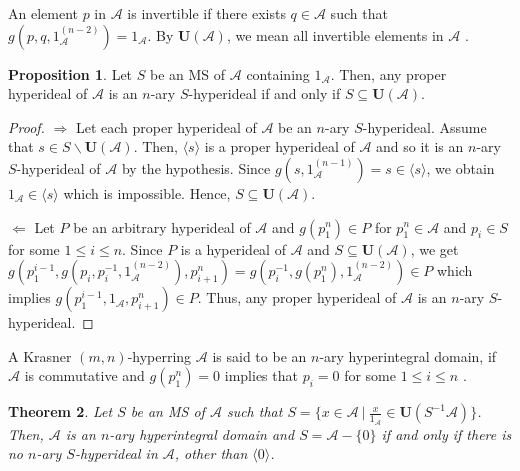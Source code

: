 \documentclass[preprint,review,10pt]{amsart}
\newtheorem{theorem}{Theorem}[section]
\theoremstyle{definition}
\newtheorem{proposition}[theorem]{Proposition}
\theoremstyle{remark}
\numberwithin{equation}{section}
\begin{document}
An element $p$ in $\mathscr{A}$ is invertible if there exists $q \in \mathscr{A}$ such that $g(p,q,1_{\mathscr{A}}^{(n-2)})=1_{\mathscr{A}}$.  By  $\mathbf{U}(\mathscr{A})$, we mean all invertible elements in $\mathscr{A}$ \cite{sorc1}.
\begin{proposition} \label{8}
Let $S$ be an MS of $\mathscr{A}$ containing $1_\mathscr{A}$. Then, any proper hyperideal of $\mathscr{A}$ is an $n$-ary $S$-hyperideal if and only if $S \subseteq \mathbf{U}(\mathscr{A})$.
\end{proposition}
\begin{proof}
$\Longrightarrow$ Let each proper hyperideal of $\mathscr{A}$ be an $n$-ary $S$-hyperideal. Assume that $ s \in S \backslash \mathbf{U}(\mathscr{A})$. Then, $\langle s \rangle$ is a proper hyperideal of $\mathscr{A}$ and so it is an $n$-ary $S$-hyperideal of $\mathscr{A}$ by the hypothesis. Since $g(s,1_\mathscr{A}^{(n-1)})=s \in \langle s \rangle$, we obtain $1_\mathscr{A} \in  \langle s \rangle$ which is impossible. Hence, 
$S \subseteq \mathbf{U}(\mathscr{A})$. 

$\Longleftarrow$ Let $P$ be an arbitrary hyperideal of $\mathscr{A}$ and $g(p_1^n) \in P$ for $p_1^n \in \mathscr{A}$ and $p_i \in S$ for some $1 \leq i \leq n$. Since $P$ is a hyperideal of $\mathscr{A}$ and  $S \subseteq \mathbf{U}(\mathscr{A})$, we get $g(p_1^{i-1},g(p_i,p_i^{-1},1_\mathscr{A}^{(n-2)}),p_{i+1}^n)=g(p_i^{-1},g(p_1^n),1_\mathscr{A}^{(n-2)}) \in P$ which implies  $g(p_1^{i-1},1_\mathscr{A},p_{i+1}^n) \in P$. Thus, any proper hyperideal of $\mathscr{A}$ is an $n$-ary $S$-hyperideal.
\end{proof}
A  Krasner $(m,n)$-hyperring $\mathscr{A}$ is said to be an $n$-ary  hyperintegral domain, if $\mathscr{A}$ is commutative and $g(p_1^n)=0$ implies that $p_i=0$ for some $1 \leq i \leq n$ \cite{sorc1}.
\begin{theorem}\label{9}
Let $S$ be an MS of $\mathscr{A}$ such that $S=\{x \in \mathscr{A} \ \vert \ \frac{x}{1_{\mathscr{A}} } \in \mathbf{U}(S^{-1}\mathscr{A})\}$. Then, $\mathscr{A}$ is an $n$-ary hyperintegral domain and $S=\mathscr{A}-\{0\}$ if and only if   there is no $n$-ary $S$-hyperideal    in $\mathscr{A}$, other than $\langle 0 \rangle$.
\end{theorem}
\end{document}
